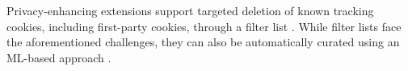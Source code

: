 Privacy-enhancing extensions support targeted deletion of known tracking cookies, including first-party cookies, through a filter list \cite{ublockResourcesLibrary,adguardrteamScriptletsWikiAboutscriptletsmd,schininaSourceBehavioralCookieremoverjs2024}.
%
While filter lists face the aforementioned challenges, they can also be automatically curated using an ML-based approach \cite{munirCookieGraphUnderstandingDetecting2023,bollingerAutomatingCookieConsent2022,schoniBlockCookiesNot2024a}.